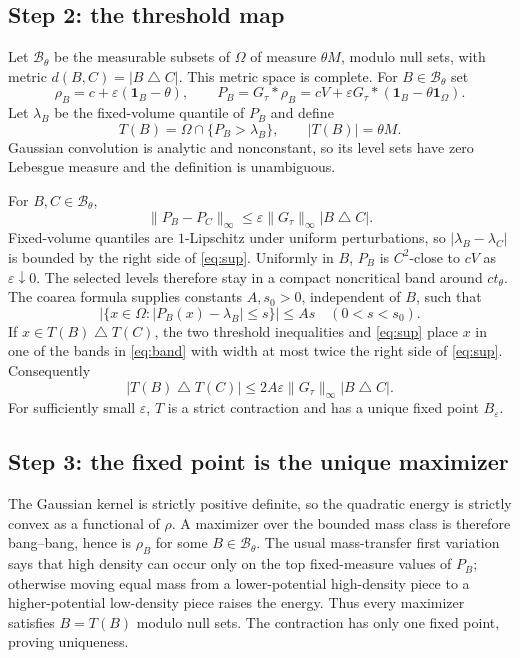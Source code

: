 \documentclass[11pt]{article}
\newcommand{\1}{\mathbf 1}
\newcommand{\symdiff}{\mathbin{\triangle}}
\begin{document}
\subsection*{Step 2: the threshold map}

Let $\mathcal B_\theta$ be the measurable subsets of $\Omega$ of measure
$\theta M$, modulo null sets, with metric
$d(B,C)=|B\symdiff C|$.  This metric space is complete.  For
$B\in\mathcal B_\theta$ set
\[
 \rho_B=c+\varepsilon(\1_B-\theta),\qquad
 P_B=G_\tau*\rho_B=cV+\varepsilon G_\tau*(\1_B-\theta\1_\Omega).
\]
Let $\lambda_B$ be the fixed-volume quantile of $P_B$ and define
\[
 T(B)=\Omega\cap\{P_B>\lambda_B\},\qquad |T(B)|=\theta M.
\]
Gaussian convolution is analytic and nonconstant, so its level sets have zero
Lebesgue measure and the definition is unambiguous.

For $B,C\in\mathcal B_\theta$,
\begin{equation}\label{eq:sup}
 \|P_B-P_C\|_\infty
 \leq \varepsilon\|G_\tau\|_\infty |B\symdiff C|.
\end{equation}
Fixed-volume quantiles are $1$-Lipschitz under uniform perturbations, so
$|\lambda_B-\lambda_C|$ is bounded by the right side of
\eqref{eq:sup}.  Uniformly in $B$, $P_B$ is $C^2$-close to $cV$ as
$\varepsilon\downarrow0$.  The selected levels therefore stay in a compact
noncritical band around $ct_\theta$.  The coarea formula supplies constants
$A,s_0>0$, independent of $B$, such that
\begin{equation}\label{eq:band}
 \big|\{x\in\Omega:|P_B(x)-\lambda_B|\leq s\}\big|\leq As
 \quad(0<s<s_0).
\end{equation}
If $x\in T(B)\symdiff T(C)$, the two threshold inequalities and
\eqref{eq:sup} place $x$ in one of the bands in \eqref{eq:band} with width at
most twice the right side of \eqref{eq:sup}.  Consequently
\[
 |T(B)\symdiff T(C)|
 \leq 2A\varepsilon\|G_\tau\|_\infty |B\symdiff C|.
\]
For sufficiently small $\varepsilon$, $T$ is a strict contraction and has a
unique fixed point $B_\varepsilon$.

\subsection*{Step 3: the fixed point is the unique maximizer}

The Gaussian kernel is strictly positive definite, so the quadratic energy is
strictly convex as a functional of $\rho$.  A maximizer over the bounded mass
class is therefore bang--bang, hence is $\rho_B$ for some
$B\in\mathcal B_\theta$.  The usual mass-transfer first variation says that
high density can occur only on the top fixed-measure values of $P_B$;
otherwise moving equal mass from a lower-potential high-density piece to a
higher-potential low-density piece raises the energy.  Thus every maximizer
satisfies $B=T(B)$ modulo null sets.  The contraction has only one fixed
point, proving uniqueness.
\end{document}
